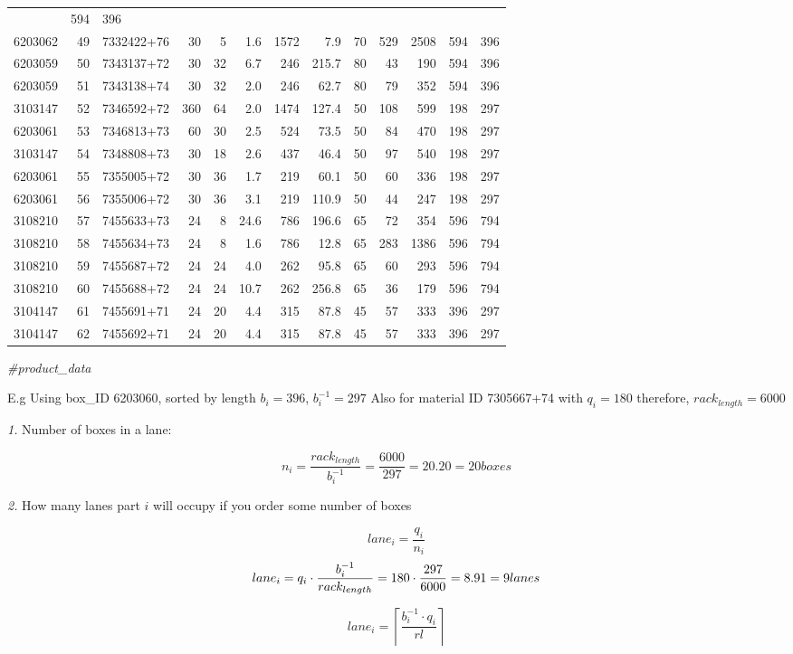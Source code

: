 \documentclass[
]{article}
\newenvironment{Shaded}{\begin{snugshade}}{\end{snugshade}}
\newcommand{\CommentTok}[1]{\textcolor[rgb]{0.56,0.35,0.01}{\textit{#1}}}
\begin{document}
\begin{longtable}[]{@{}rrlrrrrrrrrrr@{}}
& 594 & 396\tabularnewline
6203062 & 49 & 7332422+76 & 30 & 5 & 1.6 & 1572 & 7.9 & 70 & 529 & 2508
& 594 & 396\tabularnewline
6203059 & 50 & 7343137+72 & 30 & 32 & 6.7 & 246 & 215.7 & 80 & 43 & 190
& 594 & 396\tabularnewline
6203059 & 51 & 7343138+74 & 30 & 32 & 2.0 & 246 & 62.7 & 80 & 79 & 352 &
594 & 396\tabularnewline
3103147 & 52 & 7346592+72 & 360 & 64 & 2.0 & 1474 & 127.4 & 50 & 108 &
599 & 198 & 297\tabularnewline
6203061 & 53 & 7346813+73 & 60 & 30 & 2.5 & 524 & 73.5 & 50 & 84 & 470 &
198 & 297\tabularnewline
3103147 & 54 & 7348808+73 & 30 & 18 & 2.6 & 437 & 46.4 & 50 & 97 & 540 &
198 & 297\tabularnewline
6203061 & 55 & 7355005+72 & 30 & 36 & 1.7 & 219 & 60.1 & 50 & 60 & 336 &
198 & 297\tabularnewline
6203061 & 56 & 7355006+72 & 30 & 36 & 3.1 & 219 & 110.9 & 50 & 44 & 247
& 198 & 297\tabularnewline
3108210 & 57 & 7455633+73 & 24 & 8 & 24.6 & 786 & 196.6 & 65 & 72 & 354
& 596 & 794\tabularnewline
3108210 & 58 & 7455634+73 & 24 & 8 & 1.6 & 786 & 12.8 & 65 & 283 & 1386
& 596 & 794\tabularnewline
3108210 & 59 & 7455687+72 & 24 & 24 & 4.0 & 262 & 95.8 & 65 & 60 & 293 &
596 & 794\tabularnewline
3108210 & 60 & 7455688+72 & 24 & 24 & 10.7 & 262 & 256.8 & 65 & 36 & 179
& 596 & 794\tabularnewline
3104147 & 61 & 7455691+71 & 24 & 20 & 4.4 & 315 & 87.8 & 45 & 57 & 333 &
396 & 297\tabularnewline
3104147 & 62 & 7455692+71 & 24 & 20 & 4.4 & 315 & 87.8 & 45 & 57 & 333 &
396 & 297\tabularnewline
\bottomrule
\end{longtable}

\begin{Shaded}
\begin{Highlighting}[]
\CommentTok{#product_data}
\end{Highlighting}
\end{Shaded}

E.g Using box\_ID 6203060, sorted by length \(b_i=396\),
\(b_i^{-1}=297\) Also for material ID 7305667+74 with \(q_i=180\)
therefore, \(rack_{length}=6000\)

\emph{1.} Number of boxes in a lane:

\[n_i=\frac {rack_{length}}{b_i^{-1}}=\frac {6000}{297}=20.20=20boxes\]

\emph{2.} How many lanes part \(i\) will occupy if you order some number
of boxes

\[lane_i=\frac {q_i}{n_i}\]
\[lane_i=q_i \cdot \frac {b_i^{-1}}{rack_{length}}=180 \cdot \frac {297}{6000}=8.91= 9 \space lanes \]

\[lane_i= \left\lceil\frac{b^{-1}_i \cdot q_i}{rl} \right \rceil\]
\end{document}
